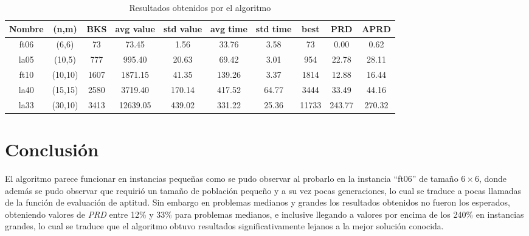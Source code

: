 \documentclass[12pt,a4paper]{article}
\begin{document}
    
    \begin{table}[H]
        \centering
        \begin{tabular}{|c|c|c|c|c|c|c|c|c|c|}
        \hline
        Nombre & (n,m) & BKS & avg value & std value & avg time & std time & best & PRD & APRD \\
        \hline
        ft06 & (6,6) & 73 & 73.45 & 1.56 & 33.76 & 3.58 & 73 & 0.00 & 0.62 \\

la05 & (10,5) & 777 & 995.40 & 20.63 & 69.42 & 3.01 & 954 & 22.78 & 28.11 \\

ft10 & (10,10) & 1607 & 1871.15 & 41.35 & 139.26 & 3.37 & 1814 & 12.88 & 16.44 \\
la40 & (15,15) & 2580 & 3719.40 & 170.14 & 417.52 & 64.77 & 3444 & 33.49 & 44.16 \\

la33 & (30,10) & 3413 & 12639.05 & 439.02 & 331.22 & 25.36 & 11733 & 243.77 & 270.32\\
\hline
        \end{tabular}
        \caption{Resultados obtenidos por el algoritmo}
        \label{tab:my_label}
    \end{table}

\section{Conclusión}

El algoritmo parece funcionar en instancias pequeñas como se pudo observar al probarlo en la instancia ``ft06'' de tamaño $ 6 \times 6$, donde además se pudo observar que requirió un tamaño de población pequeño y a su vez pocas generaciones, lo cual se traduce a pocas llamadas de la función de evaluación de aptitud. Sin embargo en problemas medianos y grandes los resultados obtenidos no fueron los esperados, obteniendo valores de \textit{PRD} entre 12\% y 33\% para problemas medianos, e inclusive llegando a valores por encima de los 240\% en instancias grandes, lo cual se traduce que el algoritmo obtuvo resultados significativamente lejanos a la mejor solución conocida. 


\newpage


\end{document}
